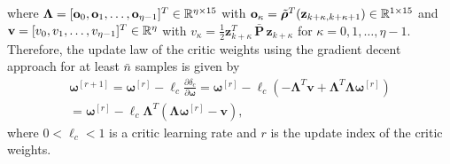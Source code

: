\documentclass[conference]{IEEEtran}
\begin{document}
where $\bm{\Lambda} = [{\bf o}_0,{\bf o}_1,\ldots,{\bf o}_{\eta-1}]^T \in \mathbb{R}^{\eta\times 15}$ with ${\bf o}_\kappa = \tilde{\bm{\rho}}^T({\bf z}_{k+\kappa, k+\kappa+1}) \in \mathbb{R}^{1\times 15}$ and ${\bf v} =[v_0,v_1,\ldots,v_{\eta-1}]^T \in \mathbb{R}^{\eta}$ with $v_\kappa = \frac{1}{2}\mathbf{z}_{k+\kappa}^T \, \bar{\mathbf{P}} \, \mathbf{z}_{k+\kappa}$ for $\kappa = 0,1,\ldots, \eta-1$. %
Therefore, the update law of the critic weights using the gradient decent approach for at least $\bar n$ samples is given by %
\begin{multline}
  \bm{\omega}^{[r+1]} = \bm{\omega}^{[r]} - \ell_c\frac{\partial\delta_c}{\partial \bm{\omega}} = \bm{\omega}^{[r]} - \ell_c\left(-\bm{\Lambda}^T\mathbf{v} + \bm{\Lambda}^T \bm{\Lambda}\bm{\omega}^{[r]}\right)\\ 
=\bm{\omega}^{[r]} - \ell_c \bm{\Lambda}^T\left(\bm{\Lambda}\bm{\omega}^{[r]}-\mathbf{v}\right), 
\label{eq:criticWeights}
\end{multline}
%
where $0<\ell_c<1$ is a critic learning rate and $r$ is the  update index of the critic weights. 
\end{document}
